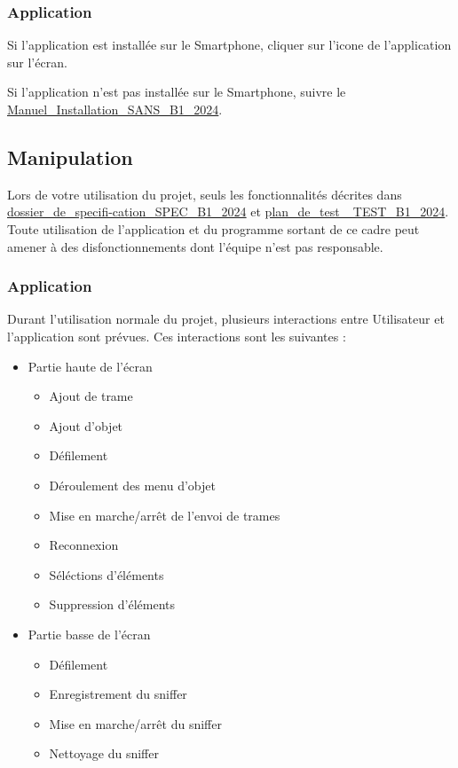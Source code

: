 \subsubsection{Application {\nomApplication}}
Si l'application {\nomApplication} est installée sur le Smartphone, cliquer sur l'icone de l'application {\nomApplication} sur l'écran.

Si l'application {\nomApplication} n'est pas installée sur le Smartphone, suivre le \hyperref[INST]{Manuel\_Installation\_SANS\_B1\_2024}.

\subsection{Manipulation}
Lors de votre utilisation du projet, seuls les fonctionnalités décrites dans \hyperref[SPEC]{dossier\_de\_specifi-cation\_SPEC\_B1\_2024} et \hyperref[plan_de_test]{plan\_de\_test \_TEST\_B1\_2024}. Toute utilisation de l'application {\nomApplication} et du programme {\nomLogiciel} sortant de ce cadre peut amener à des disfonctionnements dont l'équipe {\teamName} n'est pas responsable.

\subsubsection{Application {\nomApplication}}
Durant l'utilisation normale du projet, plusieurs interactions entre Utilisateur et l'application {\nomApplication} sont prévues. Ces interactions sont les suivantes :

\begin{itemize}
    \item Partie haute de l'écran
    \begin{itemize}
        \item Ajout de trame
        \item Ajout d'objet
        \item Défilement
        \item Déroulement des menu d'objet
        \item Mise en marche/arrêt de l'envoi de trames
        \item Reconnexion
        \item Séléctions d'éléments
        \item Suppression d'éléments
    \end{itemize}
    \item Partie basse de l'écran
    \begin{itemize}
        \item Défilement
        \item Enregistrement du sniffer
        \item Mise en marche/arrêt du sniffer
        \item Nettoyage du sniffer
    \end{itemize}
\end{itemize}

